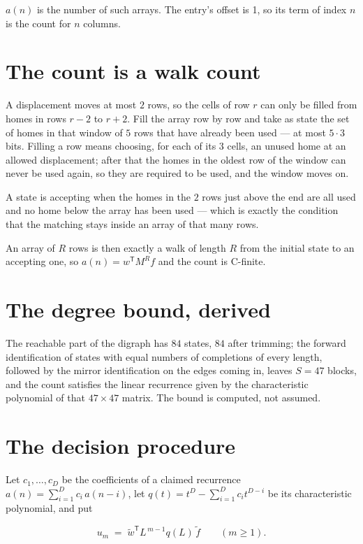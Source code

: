 \documentclass[11pt]{article}
\theoremstyle{definition}
\begin{document}
$a(n)$ is the number of such arrays. The entry's offset is 1, so its term of index $n$ is the count for $n$ columns.

\section{The count is a walk count}

A displacement moves at most $2$ rows, so the cells of row $r$ can only be filled from homes in rows $r-2$ to $r+2$. Fill the array row by row and take as state the set of homes in that window of $5$ rows that have already been used --- at most $5\cdot3$ bits. Filling a row means choosing, for each of its $3$ cells, an unused home at an allowed displacement; after that the homes in the oldest row of the window can never be used again, so they are required to be used, and the window moves on.

A state is accepting when the homes in the $2$ rows just above the end are all used and no home below the array has been used --- which is exactly the condition that the matching stays inside an array of that many rows.

An array of $R$ rows is then exactly a walk of length $R$ from the initial state to an accepting one, so $a(n) = w^{\mathsf T}M^{R}f$ and the count is C-finite.

\section{The degree bound, derived}

The reachable part of the digraph has $84$ states, $84$ after trimming; the forward identification of states with equal numbers of completions of every length, followed by the mirror identification on the edges coming in, leaves $S = 47$ blocks, and the count satisfies the linear recurrence given by the characteristic polynomial of that $47\times47$ matrix. The bound is computed, not assumed.

\section{The decision procedure}

Let $c_1,\dots,c_D$ be the coefficients of a claimed recurrence $a(n) = \sum_{i=1}^{D} c_i\,a(n-i)$, let $q(t) = t^{D} - \sum_{i=1}^{D} c_i t^{D-i}$ be its characteristic polynomial, and put

\[u_m \;=\; \tilde w^{\mathsf T} L^{\,m-1} q(L)\,\tilde f \qquad (m \ge 1).\]
\end{document}
